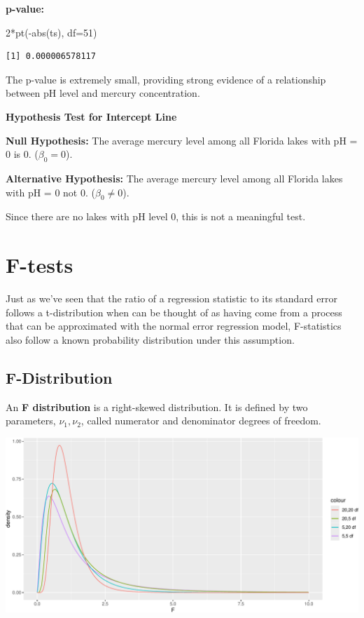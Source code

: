 \documentclass[
  letterpaper,
  DIV=11,
  numbers=noendperiod]{scrreprt}
\newenvironment{Shaded}{\begin{snugshade}}{\end{snugshade}}
\newcommand{\AttributeTok}[1]{\textcolor[rgb]{0.40,0.45,0.13}{#1}}
\newcommand{\DecValTok}[1]{\textcolor[rgb]{0.68,0.00,0.00}{#1}}
\newcommand{\FunctionTok}[1]{\textcolor[rgb]{0.28,0.35,0.67}{#1}}
\newcommand{\NormalTok}[1]{\textcolor[rgb]{0.00,0.23,0.31}{#1}}
\newcommand{\SpecialCharTok}[1]{\textcolor[rgb]{0.37,0.37,0.37}{#1}}
\begin{document}
\textbf{p-value:}

\begin{Shaded}
\begin{Highlighting}[]
\DecValTok{2}\SpecialCharTok{*}\FunctionTok{pt}\NormalTok{(}\SpecialCharTok{{-}}\FunctionTok{abs}\NormalTok{(ts), }\AttributeTok{df=}\DecValTok{51}\NormalTok{)}
\end{Highlighting}
\end{Shaded}

\begin{verbatim}
[1] 0.000006578117
\end{verbatim}

The p-value is extremely small, providing strong evidence of a
relationship between pH level and mercury concentration.

\textbf{Hypothesis Test for Intercept Line}

\textbf{Null Hypothesis:} The average mercury level among all Florida
lakes with pH = 0 is 0. (\(\beta_0=0\)).

\textbf{Alternative Hypothesis:} The average mercury level among all
Florida lakes with pH = 0 not 0. (\(\beta_0 \neq 0\)).

Since there are no lakes with pH level 0, this is not a meaningful test.

\section{F-tests}\label{f-tests}

Just as we've seen that the ratio of a regression statistic to its
standard error follows a t-distribution when can be thought of as having
come from a process that can be approximated with the normal error
regression model, F-statistics also follow a known probability
distribution under this assumption.

\subsection{F-Distribution}\label{f-distribution}

An \textbf{F distribution} is a right-skewed distribution. It is defined
by two parameters, \(\nu_1, \nu_2\), called numerator and denominator
degrees of freedom.

\includegraphics{Ch4_files/figure-pdf/unnamed-chunk-45-1.pdf}
\end{document}
